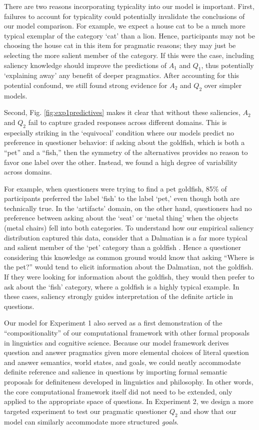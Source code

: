 \documentclass[11pt, floatsintext]{apa6}
\begin{document}
There are two reasons incorporating typicality into our model is important. 
First, failures to account for typicality could potentially invalidate the conclusions of our model comparison. 
For example, we expect a house cat to be a much more typical exemplar of the category `cat' than a lion. 
Hence, participants may not be choosing the house cat in this item for pragmatic reasons; they may just be selecting the more salient member of the category. 
If this were the case, including saliency knowledge should improve the predictions of $A_1$ and $Q_1$, thus potentially `explaining away' any benefit of deeper pragmatics. 
After accounting for this potential confound, we still found strong evidence for $A_2$ and $Q_2$ over simpler models.

Second, Fig. \ref{fig:exp1predictives} makes it clear that without these saliencies, $A_2$ and $Q_2$ fail to capture graded responses across different domains. 
This is especially striking in the `equivocal' condition where our models predict no preference in questioner behavior: if asking about the goldfish, which is both a ``pet'' and a ``fish,'' then the symmetry of the alternatives provides no reason to favor one label over the other. 
Instead, we found a high degree of variability across domains. 

For example, when questioners were trying to find a pet goldfish, 85\% of participants preferred the label `fish' to the label `pet,' even though both are technically true. 
In the `artifacts' domain, on the other hand, questioners had no preference between asking about the `seat' or `metal thing' when the objects (metal chairs) fell into both categories.
To understand how our empirical saliency distribution captured this data, consider that a Dalmatian is a far more typical and salient member of the `pet' category than a goldfish \cite{Rosch75}. 
Hence a questioner considering this knowledge as common ground would know that asking ``Where is the pet?'' would tend to elicit information about the Dalmatian, not the goldfish. 
If they were looking for information about the goldfish, they would then prefer to ask about the `fish' category, where a goldfish is a highly typical example. 
In these cases, saliency strongly guides interpretation of the definite article in questions.

Our model for Experiment 1 also served as a first demonstration of the ``compositionality'' of our computational framework with other formal proposals in linguistics and cognitive science.
Because our model framework derives question and answer pragmatics given more elemental choices of literal question and answer semantics, world states, and goals, we could neatly accommodate definite reference and salience in questions by importing formal semantic proposals for definiteness developed in linguistics and philosophy.
In other words, the core computational framework itself did not need to be extended, only applied to the appropriate space of questions. 
In Experiment 2, we design a more targeted experiment to test our pragmatic questioner $Q_2$ and show that our model can similarly accommodate more structured \emph{goals}.
\end{document}
